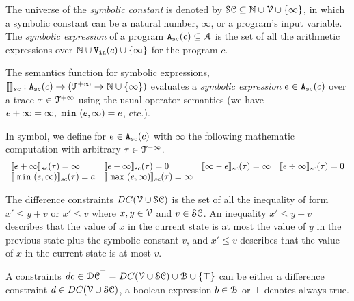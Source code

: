 \begin{defn}
 \label{def:symbolic_expr}
The universe of the \emph{symbolic constant} is denoted by $\mathcal{SC} \subseteq \mathbb{N} \cup \mathcal{V} \cup \{\infty \}$, in which a symbolic constant can be a natural number, $\infty$, or a program's input variable.
 The \emph{symbolic expression} of a program ${\mathtt{A_{sc}}}(c) \subseteq \mathcal{A}$ is the set of all the arithmetic expressions over $\mathbb{N} \cup {\ensuremath{\mathtt{V_{\mathtt{in}}}}}(c) \cup \{\infty \}$ for the program $c$.
\end{defn}
\begin{defn}
    \label{def:symbolic_expr_semantics}
      The semantics function for symbolic expressions, $\llbracket  \rrbracket_{sc}: {\mathtt{A_{sc}}}(c) \to (\mathcal{T}^{+\infty} \to \mathbb{N} \cup \{\infty \})$ evaluates a \emph{symbolic expression}
      $e \in {\ensuremath{\mathtt{A_{sc}}}}(c)$ over a trace $\mathtt{\tau} \in \mathcal{T}^{+\infty}$ using the usual operator semantics (we have 
      $e + \infty = \infty, ~\mathtt{min}~(e, \infty) = e$, etc.).
    \end{defn}
    In symbol, we define for $e \in {\ensuremath{\mathtt{A_{sc}}}}(c)$ with $\infty$ the following mathematic computation with arbitrary $\mathtt{\tau} \in \mathcal{T}^{+\infty}$.
    \[
     \begin{array}{llll}
     \llbracket e + \infty \rrbracket_{sc} (\mathtt{\tau}) = \infty
    &
    \llbracket e - \infty \rrbracket_{sc} (\mathtt{\tau}) = 0
    &
    \llbracket \infty - e \rrbracket_{sc} (\mathtt{\tau}) = \infty
     &
    \llbracket e \div \infty \rrbracket_{sc} (\mathtt{\tau}) = 0
    \\
    \llbracket ~\mathtt{min}~(e, \infty) \rrbracket_{sc} (\mathtt{\tau}) = a
    &
    \llbracket ~\mathtt{max}~(e, \infty) \rrbracket_{sc} (\mathtt{\tau}) = \infty
     \end{array}
    \]
   
\begin{defn}
 The difference constraints $DC(\mathcal{V} \cup \mathcal{SC})$ is the set of all the inequality of
form $x' \leq y + v$ or $x' \leq v$ where $x, y \in \mathcal{V} $ and $v \in \mathcal{SC}$.
An inequality $x' \leq y + v$ describes that the value of $x$ in the current state is
at most the value of $y$ in the previous state plus the symbolic constant $v$, and $x' \leq v$ describes that the value of $x$ in the current state is
at most $v$.
\end{defn}

\begin{defn}[Constraints]
A constraints $dc \in \mathcal{DC}^{\top} = DC(\mathcal{V} \cup \mathcal{SC}) \cup \mathcal{B}\cup \{\top\}$ can be either a
difference constraint $d \in DC(\mathcal{V} \cup \mathcal{SC})$, a boolean expression $b \in \mathcal{B}$
or $\top$ denotes always true.
\end{defn}

